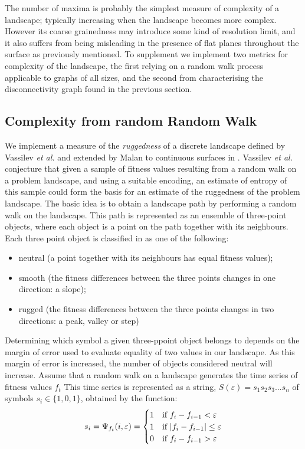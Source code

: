 The number of maxima is probably the simplest measure of complexity of a landscape; typically increasing when the landscape becomes more complex.  However its coarse grainedness may introduce some kind of resolution limit, and it also suffers from being misleading in the presence of flat planes throughout the surface as previously mentioned.  To supplement we implement two metrics for complexity of the landscape, the first relying on a random walk process applicable to graphs of all sizes, and the second from characterising the disconnectivity graph found in the previous section.

\subsection{Complexity from random Random Walk}
We implement a measure of the \textit{ruggedness} of a discrete landscape defined by Vassilev \textit{et al.} \cite{VKVassilevTCFogarty} and extended by  Malan to continuous surfaces in \cite{Malan2009}.  Vassilev \textit{et al.} conjecture that given a sample of fitness values resulting from a random walk on a problem landscape, and using a suitable encoding, an estimate of entropy of this sample could form the basis for an estimate of the ruggedness of the problem landscape.  The basic idea is to obtain a landscape path by performing a random walk on the landscape. This path is represented as an ensemble of three-point objects, where each object is a point on the path together with its neighbours. Each three point object is classified in \cite{Malan2009} as one of the following:
\noindent
\begin{itemize}
\item neutral (a point together with its neighbours has equal fitness values);
\item smooth (the fitness differences between the three points changes in one direction: a slope);
\item rugged (the fitness differences between the three points changes in two directions: a peak, valley or step)
\end{itemize}

Determining which symbol a given three-ppoint object belongs to depends on the margin of error used to evaluate equality of two values in our landscape.  As this margin of error is increased, the number of objects considered neutral will increase.
Assume that a random walk on a landscape generates the time series of fitness values ${f_t}$ This time series is represented as
a string, $S(\varepsilon)= s_1s_2s_3...s_n$ of symbols $s_i \in \{1, 0, 1\}$, obtained by the function:
\[
 s_i = \Psi_{f_t}(i,\varepsilon) = 
  \begin{cases}
   \-1 & \text{if } f_i - f_{i-1} < \varepsilon \\
   1 & \text{if } \vert f_i - f_{i-1} \vert \leq \varepsilon \\
   0 & \text{if } f_i - f_{i-1} > \varepsilon
  \end{cases}
\]

